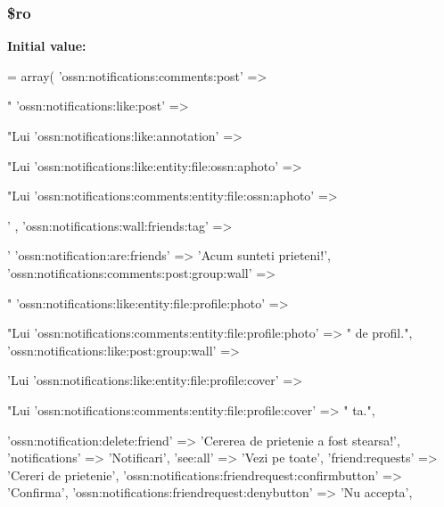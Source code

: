\subsubsection[{\texorpdfstring{\$ro}{$ro}}]{\setlength{\rightskip}{0pt plus 5cm}\$ro}\hypertarget{components_2_ossn_notifications_2locale_2ossn_8ro_8php_ad432e1965f7fa8ce0807b244734e70f8}{}\label{components_2_ossn_notifications_2locale_2ossn_8ro_8php_ad432e1965f7fa8ce0807b244734e70f8}
{\bfseries Initial value\+:}
\begin{DoxyCode}
= array(
    \textcolor{stringliteral}{'ossn:notifications:comments:post'} => \textcolor{stringliteral}{"%
    \textcolor{stringliteral}{'ossn:notifications:like:post'} => \textcolor{stringliteral}{"Lui %
    \textcolor{stringliteral}{'ossn:notifications:like:annotation'} => \textcolor{stringliteral}{"Lui %
    \textcolor{stringliteral}{'ossn:notifications:like:entity:file:ossn:aphoto'} => \textcolor{stringliteral}{"Lui %
    \textcolor{stringliteral}{'ossn:notifications:comments:entity:file:ossn:aphoto'} => \textcolor{stringliteral}{'%
      ,
    \textcolor{stringliteral}{'ossn:notifications:wall:friends:tag'} => \textcolor{stringliteral}{'%
    \textcolor{stringliteral}{'ossn:notification:are:friends'} => \textcolor{stringliteral}{'Acum sunteti prieteni!'},
    \textcolor{stringliteral}{'ossn:notifications:comments:post:group:wall'} => \textcolor{stringliteral}{"%
    \textcolor{stringliteral}{'ossn:notifications:like:entity:file:profile:photo'} => \textcolor{stringliteral}{"Lui %
    \textcolor{stringliteral}{'ossn:notifications:comments:entity:file:profile:photo'} => \textcolor{stringliteral}{"%
       de profil."},
    \textcolor{stringliteral}{'ossn:notifications:like:post:group:wall'} => \textcolor{stringliteral}{'Lui %
    \textcolor{stringliteral}{'ossn:notifications:like:entity:file:profile:cover'} => \textcolor{stringliteral}{"Lui %
    \textcolor{stringliteral}{'ossn:notifications:comments:entity:file:profile:cover'} => \textcolor{stringliteral}{"%
       ta."},
    
    \textcolor{stringliteral}{'ossn:notification:delete:friend'} => \textcolor{stringliteral}{'Cererea de prietenie a fost stearsa!'},
    \textcolor{stringliteral}{'notifications'} => \textcolor{stringliteral}{'Notificari'},
    \textcolor{stringliteral}{'see:all'} => \textcolor{stringliteral}{'Vezi pe toate'},
    \textcolor{stringliteral}{'friend:requests'} => \textcolor{stringliteral}{'Cereri de prietenie'},
    \textcolor{stringliteral}{'ossn:notifications:friendrequest:confirmbutton'} => \textcolor{stringliteral}{'Confirma'},
    \textcolor{stringliteral}{'ossn:notifications:friendrequest:denybutton'} => \textcolor{stringliteral}{'Nu accepta'},
    
}}}}}}}}}}
\end{DoxyCode}
